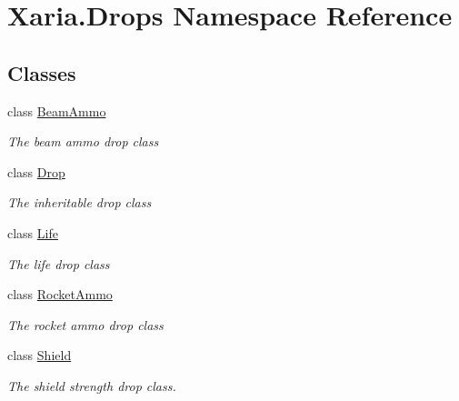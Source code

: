 \hypertarget{namespaceXaria_1_1Drops}{}\section{Xaria.\+Drops Namespace Reference}
\label{namespaceXaria_1_1Drops}
\subsection*{Classes}
\begin{DoxyCompactItemize}
\item 
class \hyperlink{classXaria_1_1Drops_1_1BeamAmmo}{Beam\+Ammo}
\begin{DoxyCompactList}\small\item\em The beam ammo drop class \end{DoxyCompactList}\item 
class \hyperlink{classXaria_1_1Drops_1_1Drop}{Drop}
\begin{DoxyCompactList}\small\item\em The inheritable drop class \end{DoxyCompactList}\item 
class \hyperlink{classXaria_1_1Drops_1_1Life}{Life}
\begin{DoxyCompactList}\small\item\em The life drop class \end{DoxyCompactList}\item 
class \hyperlink{classXaria_1_1Drops_1_1RocketAmmo}{Rocket\+Ammo}
\begin{DoxyCompactList}\small\item\em The rocket ammo drop class \end{DoxyCompactList}\item 
class \hyperlink{classXaria_1_1Drops_1_1Shield}{Shield}
\begin{DoxyCompactList}\small\item\em The shield strength drop class. \end{DoxyCompactList}\end{DoxyCompactItemize}
